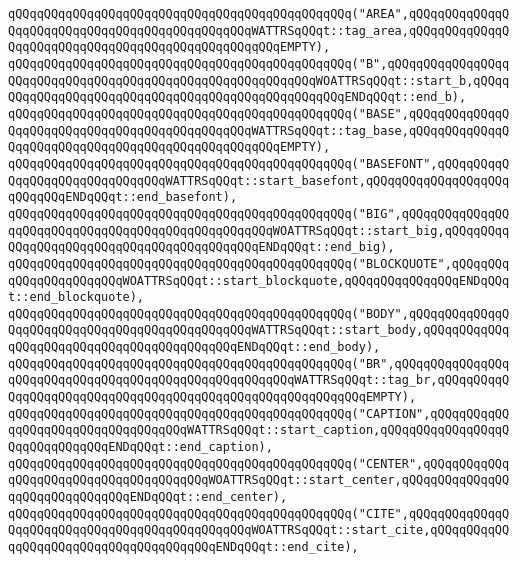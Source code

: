 \verb|qQQqqQQqqQQqqQQqqQQqqQQqqQQqqQQqqQQqqQQqqQQqqQQq("AREA",qQQqqQQqqQQqqQQqqQQqqQQqqQQqqQQqqQQqqQQqqQQqqQQqWATTRSqQQqt::tag_area,qQQqqQQqqQQqqQQqqQQqqQQqqQQqqQQqqQQqqQQqqQQqqQQqqQQqEMPTY),|\newline
\verb|qQQqqQQqqQQqqQQqqQQqqQQqqQQqqQQqqQQqqQQqqQQqqQQq("B",qQQqqQQqqQQqqQQqqQQqqQQqqQQqqQQqqQQqqQQqqQQqqQQqqQQqqQQqqQQqWOATTRSqQQqt::start_b,qQQqqQQqqQQqqQQqqQQqqQQqqQQqqQQqqQQqqQQqqQQqqQQqqQQqENDqQQqt::end_b),|\newline
\verb|qQQqqQQqqQQqqQQqqQQqqQQqqQQqqQQqqQQqqQQqqQQqqQQq("BASE",qQQqqQQqqQQqqQQqqQQqqQQqqQQqqQQqqQQqqQQqqQQqqQQqWATTRSqQQqt::tag_base,qQQqqQQqqQQqqQQqqQQqqQQqqQQqqQQqqQQqqQQqqQQqqQQqqQQqEMPTY),|\newline
\verb|qQQqqQQqqQQqqQQqqQQqqQQqqQQqqQQqqQQqqQQqqQQqqQQq("BASEFONT",qQQqqQQqqQQqqQQqqQQqqQQqqQQqqQQqWATTRSqQQqt::start_basefont,qQQqqQQqqQQqqQQqqQQqqQQqqQQqENDqQQqt::end_basefont),|\newline
\verb|qQQqqQQqqQQqqQQqqQQqqQQqqQQqqQQqqQQqqQQqqQQqqQQq("BIG",qQQqqQQqqQQqqQQqqQQqqQQqqQQqqQQqqQQqqQQqqQQqqQQqqQQqWOATTRSqQQqt::start_big,qQQqqQQqqQQqqQQqqQQqqQQqqQQqqQQqqQQqqQQqqQQqENDqQQqt::end_big),|\newline
\verb|qQQqqQQqqQQqqQQqqQQqqQQqqQQqqQQqqQQqqQQqqQQqqQQq("BLOCKQUOTE",qQQqqQQqqQQqqQQqqQQqqQQqWOATTRSqQQqt::start_blockquote,qQQqqQQqqQQqqQQqENDqQQqt::end_blockquote),|\newline
\verb|qQQqqQQqqQQqqQQqqQQqqQQqqQQqqQQqqQQqqQQqqQQqqQQq("BODY",qQQqqQQqqQQqqQQqqQQqqQQqqQQqqQQqqQQqqQQqqQQqqQQqWATTRSqQQqt::start_body,qQQqqQQqqQQqqQQqqQQqqQQqqQQqqQQqqQQqqQQqqQQqENDqQQqt::end_body),|\newline
\verb|qQQqqQQqqQQqqQQqqQQqqQQqqQQqqQQqqQQqqQQqqQQqqQQq("BR",qQQqqQQqqQQqqQQqqQQqqQQqqQQqqQQqqQQqqQQqqQQqqQQqqQQqqQQqWATTRSqQQqt::tag_br,qQQqqQQqqQQqqQQqqQQqqQQqqQQqqQQqqQQqqQQqqQQqqQQqqQQqqQQqqQQqEMPTY),|\newline
\verb|qQQqqQQqqQQqqQQqqQQqqQQqqQQqqQQqqQQqqQQqqQQqqQQq("CAPTION",qQQqqQQqqQQqqQQqqQQqqQQqqQQqqQQqqQQqWATTRSqQQqt::start_caption,qQQqqQQqqQQqqQQqqQQqqQQqqQQqqQQqENDqQQqt::end_caption),|\newline
\verb|qQQqqQQqqQQqqQQqqQQqqQQqqQQqqQQqqQQqqQQqqQQqqQQq("CENTER",qQQqqQQqqQQqqQQqqQQqqQQqqQQqqQQqqQQqqQQqWOATTRSqQQqt::start_center,qQQqqQQqqQQqqQQqqQQqqQQqqQQqqQQqENDqQQqt::end_center),|\newline
\verb|qQQqqQQqqQQqqQQqqQQqqQQqqQQqqQQqqQQqqQQqqQQqqQQq("CITE",qQQqqQQqqQQqqQQqqQQqqQQqqQQqqQQqqQQqqQQqqQQqqQQqWOATTRSqQQqt::start_cite,qQQqqQQqqQQqqQQqqQQqqQQqqQQqqQQqqQQqqQQqENDqQQqt::end_cite),|\newline
